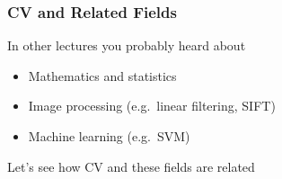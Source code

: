\documentclass[xetex,professionalfont]{beamer}
\begin{document}
{
\begin{frame}



\end{frame}
}


\begin{frame}
\frametitle{CV and Related Fields}

In other lectures you probably heard about
\begin{itemize}
    \item Mathematics and statistics
    \item Image processing (e.g.\ linear filtering, SIFT)
    \item Machine learning (e.g.\ SVM)
\end{itemize}

\bigskip
Let's see how CV and these fields are related

\end{frame}

\end{document}
